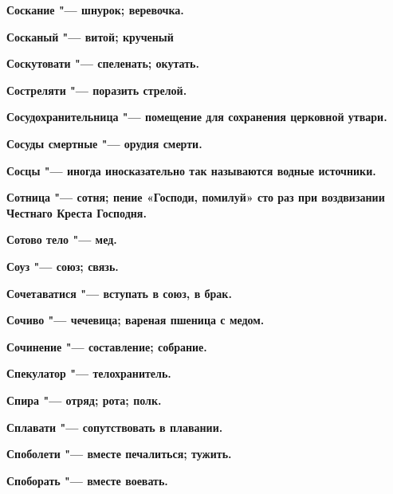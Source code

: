 \begin{mymulticols}{2}
\bfseries Соскание\normalfont{} "--- шнурок; веревочка. 




\bfseries Сосканый\normalfont{} "--- витой; крученый 




\bfseries Соскутовати\normalfont{} "--- спеленать; окутать. 




\bfseries Состреляти\normalfont{} "--- поразить стрелой. 




\bfseries Сосудохранительница\normalfont{} "--- помещение для сохранения церковной утвари. 




\bfseries Сосуды смертные\normalfont{} "--- орудия смерти. 




\bfseries Сосцы\normalfont{} "--- иногда иносказательно так называются водные источники. 




\bfseries Сотница\normalfont{} "--- сотня; пение «Господи, помилуй» сто раз при воздвизании Честнаго Креста Господня. 




\bfseries Сотово тело\normalfont{} "--- мед. 




\bfseries Соуз\normalfont{} "--- союз; связь. 




\bfseries Сочетаватися\normalfont{} "--- вступать в союз, в брак. 




\bfseries Сочиво\normalfont{} "--- чечевица; вареная пшеница с медом. 




\bfseries Сочинение\normalfont{} "--- составление; собрание. 




\bfseries Спекулатор\normalfont{} "--- телохранитель. 




\bfseries Спира\normalfont{} "--- отряд; рота; полк. 




\bfseries Сплавати\normalfont{} "--- сопутствовать в плавании. 




\bfseries Споболети\normalfont{} "--- вместе печалиться; тужить. 




\bfseries Споборать\normalfont{} "--- вместе воевать. 





\end{mymulticols}
